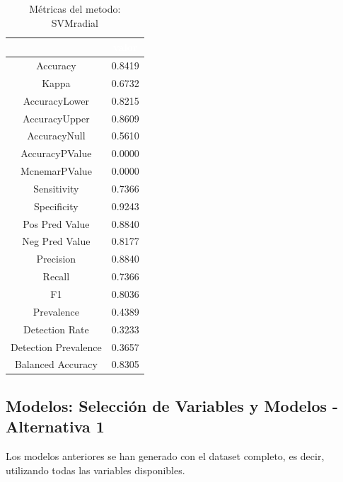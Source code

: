 \begin{table}[!h]
	
	\caption{\label{tab:metricas_SVMradial}Métricas del metodo: SVMradial }
	\centering
	\begin{tabular}[t]{cc}
		\toprule
		\rowcolor{black}  \multicolumn{1}{c}{\textcolor{white}{\textbf{metricas}}} & \multicolumn{1}{c}{\textcolor{white}{\textbf{valor}}}\\
		\midrule
		\rowcolor{gray!6}  Accuracy & 0.8419\\
		Kappa & 0.6732\\
		\rowcolor{gray!6}  AccuracyLower & 0.8215\\
		AccuracyUpper & 0.8609\\
		\rowcolor{gray!6}  AccuracyNull & 0.5610\\
		\addlinespace
		AccuracyPValue & 0.0000\\
		\rowcolor{gray!6}  McnemarPValue & 0.0000\\
		Sensitivity & 0.7366\\
		\rowcolor{gray!6}  Specificity & 0.9243\\
		Pos Pred Value & 0.8840\\
		\addlinespace
		\rowcolor{gray!6}  Neg Pred Value & 0.8177\\
		Precision & 0.8840\\
		\rowcolor{gray!6}  Recall & 0.7366\\
		F1 & 0.8036\\
		\rowcolor{gray!6}  Prevalence & 0.4389\\
		\addlinespace
		Detection Rate & 0.3233\\
		\rowcolor{gray!6}  Detection Prevalence & 0.3657\\
		Balanced Accuracy & 0.8305\\
		\bottomrule
	\end{tabular}
\end{table}


\clearpage

\subsection{Modelos: Selección de Variables y Modelos - Alternativa 1}

Los modelos anteriores se han generado con el dataset completo, es decir, utilizando todas las variables disponibles.\\

